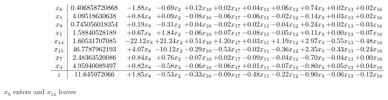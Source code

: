 \documentclass[9pt]{article}
\begin{document}
 \[\begin{array}{c| c c@{\hskip 2pt} c@{\hskip 2pt} c@{\hskip 2pt} c@{\hskip 2pt} c@{\hskip 2pt} c@{\hskip 2pt} c@{\hskip 2pt} c@{\hskip 2pt} c@{\hskip 2pt} }
 x_{6}   &  0.406858720868 & -1.88 x_{8} & -0.69 x_{2} & +  0.12 x_{10} & +  0.02 x_{17} & +  0.04 x_{11} & +  0.06 x_{12} & +  0.74 x_{3} & +  0.02 x_{13} & +  0.02 x_{16}\\
 x_{5}   &  4.09518630638 & +  0.84 x_{8} & +  0.09 x_{2} & -0.08 x_{10} & -0.06 x_{17} & -0.06 x_{11} & -0.02 x_{12} & -0.14 x_{3} & +  0.03 x_{13} & +  0.02 x_{16}\\
 x_{9}   &  0.745056018354 & +  0.19 x_{8} & -0.31 x_{2} & +  0.04 x_{10} & -0.02 x_{17} & +  0.02 x_{11} & -0.04 x_{12} & +  0.24 x_{3} & +  0.02 x_{13} & -0.03 x_{16}\\
 x_{1}   &  1.58840528189 & +  0.67 x_{8} & +  1.84 x_{2} & -0.06 x_{10} & +  0.07 x_{17} & -0.08 x_{11} & -0.05 x_{12} & +  0.11 x_{3} & +  0.00 x_{13} & -0.07 x_{16}\\
 x_{14}   &  1.60531707085 & -22.12 x_{8} & + 21.24 x_{2} & +  0.51 x_{10} & +  1.20 x_{17} & +  0.03 x_{11} & +  1.19 x_{12} & +  2.97 x_{3} & -0.55 x_{13} & -0.48 x_{16}\\
 x_{15}   &  46.7787962193 & +  4.07 x_{8} & -10.12 x_{2} & -0.29 x_{10} & -0.53 x_{17} & -0.02 x_{11} & -0.36 x_{12} & +  2.35 x_{3} & -0.33 x_{13} & -0.24 x_{16}\\
 x_{7}   &  2.48363520086 & +  0.84 x_{8} & +  0.76 x_{2} & -0.07 x_{10} & +  0.02 x_{17} & -0.09 x_{11} & -0.04 x_{12} & -0.70 x_{3} & -0.04 x_{13} & +  0.00 x_{16}\\
 x_{4}   &  4.95940089497 & +  0.82 x_{8} & -0.58 x_{2} & -0.06 x_{10} & -0.06 x_{17} & +  0.01 x_{11} & -0.07 x_{12} & -0.80 x_{3} & +  0.05 x_{13} & +  0.04 x_{16}\\
\hline
z    &  11.645972066 & +  1.85 x_{8} & -0.53 x_{2} & -0.33 x_{10} & -0.09 x_{17} & -0.48 x_{11} & -0.22 x_{12} & -0.90 x_{3} & -0.06 x_{13} & -0.12 x_{16}\\
\end{array}\]


 $ x_{8} $ enters and $ x_{14} $ leaves 
\end{document}
